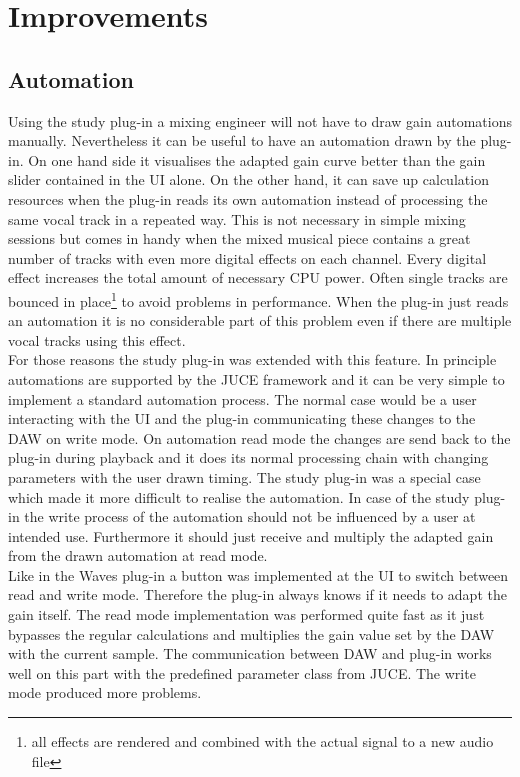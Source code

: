 \chapter{Improvements}
\label{chapter:improvements}

\section{Automation}

Using the study plug-in a mixing engineer will not have to draw gain automations manually. Nevertheless it can be useful to have an automation drawn by the plug-in. On one hand side it visualises the adapted gain curve better than the gain slider contained in the UI alone. On the other hand, it can save up calculation resources when the plug-in reads its own automation instead of processing the same vocal track in a repeated way. This is not necessary in simple mixing sessions but comes in handy when the mixed musical piece contains a great number of tracks with even more digital effects on each channel. Every digital effect increases the total amount of necessary CPU power. Often single tracks are bounced in place\footnote{all effects are rendered and combined with the actual signal to a new audio file} to avoid problems in performance. When the plug-in just reads an automation it is no considerable part of this problem even if there are multiple vocal tracks using this effect.\\
For those reasons the study plug-in was extended with this feature. In principle automations are supported by the JUCE framework and it can be very simple to implement a standard automation process. The normal case would be a user interacting with the UI and the plug-in communicating these changes to the DAW on write mode. On automation read mode the changes are send back to the plug-in during playback and it does its normal processing chain with changing parameters with the user drawn timing. The study plug-in was a special case which made it more difficult to realise the automation. In case of the study plug-in the write process of the automation should not be influenced by a user at intended use. Furthermore it should just receive and multiply the adapted gain from the drawn automation at read mode.\\
Like in the Waves plug-in a button was implemented at the UI to switch between read and write mode. Therefore the plug-in always knows if it needs to adapt the gain itself. The read mode implementation was performed quite fast as it just bypasses the regular calculations and multiplies the gain value set by the DAW with the current sample. The communication between DAW and plug-in works well on this part with the predefined parameter class from JUCE. The write mode produced more problems.\\

